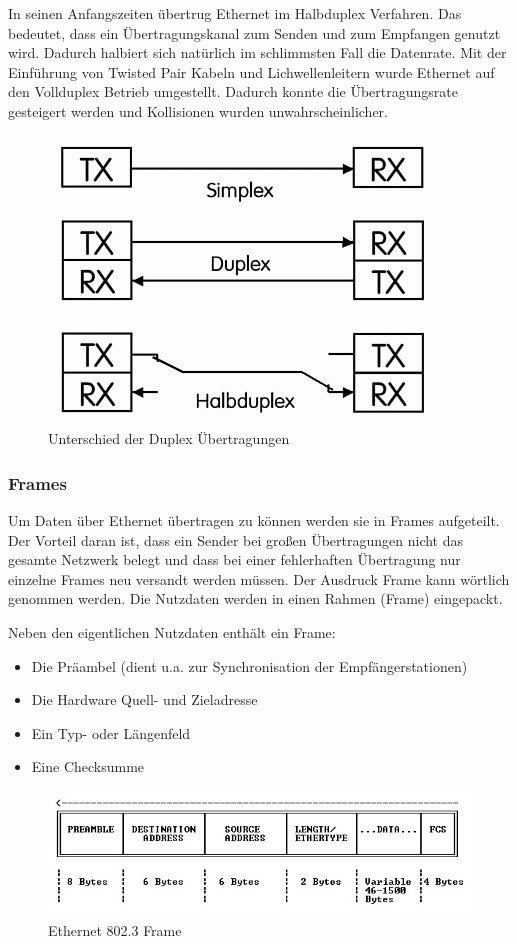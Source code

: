 \documentclass[12pt, a4paper, ngerman]{article}
\begin{document}
In seinen Anfangszeiten übertrug Ethernet im Halbduplex Verfahren. Das bedeutet, dass ein Übertragungskanal zum Senden und zum Empfangen genutzt wird. Dadurch halbiert sich natürlich im schlimmsten Fall die Datenrate. Mit der Einführung von Twisted Pair Kabeln und Lichwellenleitern wurde Ethernet auf den Vollduplex Betrieb umgestellt. Dadurch konnte die Übertragungsrate gesteigert werden und Kollisionen wurden unwahrscheinlicher.
\begin{figure}[H]
	\centering
	\includegraphics[width=0.4\linewidth]{Grafiken/duplex.jpg}
	\caption{Unterschied der Duplex Übertragungen \cite{duplex}}
	\label{duplex}
\end{figure}
 
 \subsubsection{Frames}
Um Daten über Ethernet übertragen zu können werden sie in Frames aufgeteilt. Der Vorteil daran ist, dass ein Sender bei großen Übertragungen nicht das gesamte Netzwerk belegt und dass bei einer fehlerhaften Übertragung nur einzelne Frames neu versandt werden müssen. Der Ausdruck Frame kann wörtlich genommen werden. Die Nutzdaten werden in einen Rahmen (Frame) eingepackt.

Neben den eigentlichen Nutzdaten enthält ein Frame:
\begin{itemize}
	\item Die Präambel (dient u.a. zur Synchronisation der Empfängerstationen) 
	\item Die Hardware Quell- und Zieladresse
	\item Ein Typ- oder Längenfeld
	\item Eine Checksumme
\end{itemize}
\begin{figure}[H]
	\centering
	\includegraphics[width=0.9\linewidth]{Grafiken/ethernet_frame.jpg}
	\caption{Ethernet 802.3 Frame \cite{ethernet_frame}}
	\label{ethernet_frame}
\end{figure}
\end{document}
